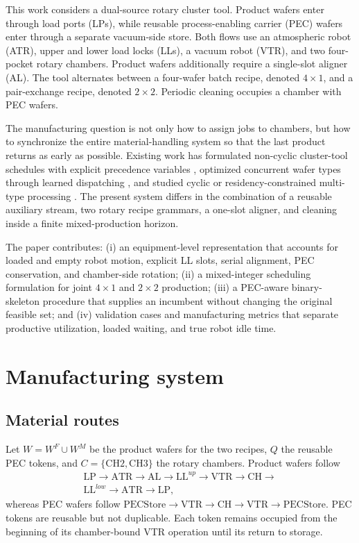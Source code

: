 \documentclass[5p,times,procedia]{elsarticle}
\begin{document}
This work considers a dual-source rotary cluster tool. Product wafers enter through load ports (LPs), while reusable process-enabling carrier (PEC) wafers enter through a separate vacuum-side store. Both flows use an atmospheric robot (ATR), upper and lower load locks (LLs), a vacuum robot (VTR), and two four-pocket rotary chambers. Product wafers additionally require a single-slot aligner (AL). The tool alternates between a four-wafer batch recipe, denoted $4\times1$, and a pair-exchange recipe, denoted $2\times2$. Periodic cleaning occupies a chamber with PEC wafers.

The manufacturing question is not only how to assign jobs to chambers, but how to synchronize the entire material-handling system so that the last product returns as early as possible. Existing work has formulated non-cyclic cluster-tool schedules with explicit precedence variables \cite{ahn2025cluster}, optimized concurrent wafer types through learned dispatching \cite{kim2025adaptive}, and studied cyclic or residency-constrained multi-type processing \cite{li2025cyclic,yang2025residency}. The present system differs in the combination of a reusable auxiliary stream, two rotary recipe grammars, a one-slot aligner, and cleaning inside a finite mixed-production horizon.

The paper contributes: (i) an equipment-level representation that accounts for loaded and empty robot motion, explicit LL slots, serial alignment, PEC conservation, and chamber-side rotation; (ii) a mixed-integer scheduling formulation for joint $4\times1$ and $2\times2$ production; (iii) a PEC-aware binary-skeleton procedure that supplies an incumbent without changing the original feasible set; and (iv) validation cases and manufacturing metrics that separate productive utilization, loaded waiting, and true robot idle time.

\section{Manufacturing system}

\subsection{Material routes}

Let $W=W^{F}\cup W^{M}$ be the product wafers for the two recipes, $Q$ the reusable PEC tokens, and $C=\{\mathrm{CH2},\mathrm{CH3}\}$ the rotary chambers. Product wafers follow
\begin{equation}
\begin{split}
\mathrm{LP}\rightarrow\mathrm{ATR}\rightarrow\mathrm{AL}\rightarrow\mathrm{LL}^{up}
\rightarrow\mathrm{VTR}\rightarrow\mathrm{CH}\rightarrow{}\\
\mathrm{LL}^{low}\rightarrow\mathrm{ATR}\rightarrow\mathrm{LP},
\end{split}
\label{eq:product-route}
\end{equation}
whereas PEC wafers follow $\mathrm{PECStore}\rightarrow\mathrm{VTR}\rightarrow\mathrm{CH}\rightarrow\mathrm{VTR}\rightarrow\mathrm{PECStore}$. PEC tokens are reusable but not duplicable. Each token remains occupied from the beginning of its chamber-bound VTR operation until its return to storage.
\end{document}
